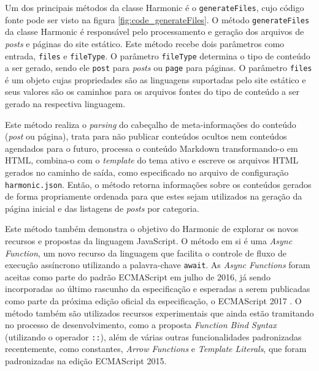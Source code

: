 \documentclass[ppginf, pep]{esinucpel}
\newcommand{\code}[1]{\texttt{#1}}
\begin{document}
Um dos principais métodos da classe Harmonic é o \code{generateFiles}, cujo código fonte pode ser visto na figura \ref{fig:code_generateFiles}. O método \code{generateFiles} da classe Harmonic é responsável pelo processamento e geração dos arquivos de \textit{posts} e páginas do site estático. Este método recebe dois parâmetros como entrada, \code{files} e \code{fileType}. O parâmetro \code{fileType} determina o tipo de conteúdo a ser gerado, sendo ele \code{post} para \textit{posts} ou \code{page} para páginas. O parâmetro \code{files} é um objeto cujas propriedades são as linguagens suportadas pelo site estático e seus valores são os caminhos para os arquivos fontes do tipo de conteúdo a ser gerado na respectiva linguagem.

Este método realiza o \textit{parsing} do cabeçalho de meta-informações do conteúdo (\textit{post} ou página), trata para não publicar conteúdos ocultos nem conteúdos agendados para o futuro, processa o conteúdo Markdown transformando-o em HTML, combina-o com o \textit{template} do tema ativo e escreve os arquivos HTML gerados no caminho de saída, como especificado no arquivo de configuração \code{harmonic.json}. Então, o método retorna informações sobre os conteúdos gerados de forma propriamente ordenada para que estes sejam utilizados na geração da página inicial e das listagens de \textit{posts} por categoria.

Este método também demonstra o objetivo do Harmonic de explorar os novos recursos e propostas da linguagem JavaScript. O método em si é uma \textit{Async Function}, um novo recurso da linguagem que facilita o controle de fluxo de execução assíncrono utilizando a palavra-chave \code{await}. As \textit{Async Functions} foram aceitas como parte do padrão ECMAScript em julho de 2016, já sendo incorporadas ao último rascunho da especificação e esperadas a serem publicadas como parte da próxima edição oficial da especificação, o ECMAScript 2017 \cite{es_finished_proposals}. O método também são utilizados recursos experimentais que ainda estão tramitando no processo de desenvolvimento, como a proposta \textit{Function Bind Syntax} (utilizando o operador \code{::}), além de várias outras funcionalidades padronizadas recentemente, como constantes, \textit{Arrow Functions} e \textit{Template Literals}, que foram padronizadas na edição ECMAScript 2015.
\end{document}
